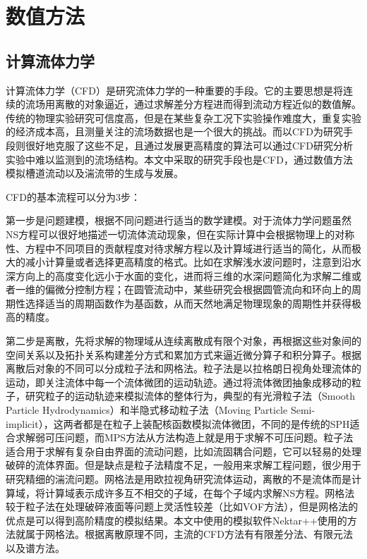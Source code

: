 \chapter{数值方法}


\section{计算流体力学}
计算流体力学（CFD）是研究流体力学的一种重要的手段。它的主要思想是将连续的流场用离散的对象逼近，通过求解差分方程进而得到流动方程近似的数值解。传统的物理实验研究可信度高，但是在某些复杂工况下实验操作难度大，重复实验的经济成本高，且测量关注的流场数据也是一个很大的挑战。而以CFD为研究手段则很好地克服了这些不足，且通过发展更高精度的算法可以通过CFD研究分析实验中难以监测到的流场结构。本文中采取的研究手段也是CFD，通过数值方法模拟槽道流动以及湍流带的生成与发展。

CFD的基本流程可以分为3步：

第一步是问题建模，根据不同问题进行适当的数学建模。对于流体力学问题虽然NS方程可以很好地描述一切流体流动现象，但在实际计算中会根据物理上的对称性、方程中不同项目的贡献程度对待求解方程以及计算域进行适当的简化，从而极大的减小计算量或者选择更高精度的格式。比如在求解浅水波问题时，注意到沿水深方向上的高度变化远小于水面的变化，进而将三维的水深问题简化为求解二维或者一维的偏微分控制方程；在圆管流动中，某些研究会根据圆管流向和环向上的周期性选择适当的周期函数作为基函数，从而天然地满足物理现象的周期性并获得极高的精度。

第二步是离散，先将求解的物理域从连续离散成有限个对象，再根据这些对象间的空间关系以及拓扑关系构建差分方式和累加方式来逼近微分算子和积分算子。根据离散后对象的不同可以分成粒子法和网格法。粒子法是以拉格朗日视角处理流体的运动，即关注流体中每一个流体微团的运动轨迹。通过将流体微团抽象成移动的粒子，研究粒子的运动轨迹来模拟流体的整体行为，典型的有光滑粒子法（Smooth Particle Hydrodynamics）和半隐式移动粒子法（Moving Particle Semi-implicit），这两者都是在粒子上装配核函数模拟流体微团，不同的是传统的SPH适合求解弱可压问题，而MPS方法从方法构造上就是用于求解不可压问题。粒子法适合用于求解有复杂自由界面的流动问题，比如流固耦合问题，它可以轻易的处理破碎的流体界面。但是缺点是粒子法精度不足，一般用来求解工程问题，很少用于研究精细的湍流问题。网格法是用欧拉视角研究流体运动，离散的不是流体而是计算域，将计算域表示成许多互不相交的子域，在每个子域内求解NS方程。网格法较于粒子法在处理破碎液面等问题上灵活性较差（比如VOF方法），但是网格法的优点是可以得到高阶精度的模拟结果。本文中使用的模拟软件Nektar++使用的方法就属于网格法。根据离散原理不同，主流的CFD方法有有限差分法、有限元法以及谱方法。

